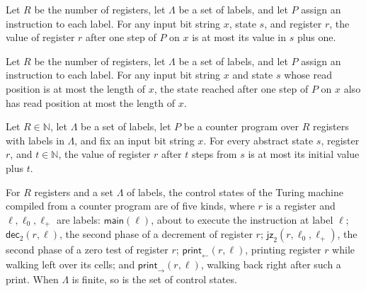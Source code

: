 \begin{theorem}
\label{Complexity.CounterProg.step_regs_le}
\leanok
{}
Let $R$ be the number of registers, let $\Lambda$ be a set of labels, and let $P$ assign
an instruction to each label. For any input bit string $x$, state $s$, and register $r$,
the value of register $r$ after one step of $P$ on $x$ is at most its value in $s$ plus
one.
\end{theorem}

\begin{theorem}
\label{Complexity.CounterProg.step_pos_le}
\leanok
{}
Let $R$ be the number of registers, let $\Lambda$ be a set of labels, and let $P$ assign
an instruction to each label. For any input bit string $x$ and state $s$ whose read
position is at most the length of $x$, the state reached after one step of $P$ on $x$
also has read position at most the length of $x$.
\end{theorem}

\begin{theorem}
\label{Complexity.CounterProg.run_regs_le}
\leanok
{}
Let $R\in\mathbb{N}$, let $\Lambda$ be a set of labels, let $P$ be a counter program
over $R$ registers with labels in $\Lambda$, and fix an input bit string $x$. For every
abstract state $s$, register $r$, and $t\in\mathbb{N}$, the value of register $r$ after
$t$ steps from $s$ is at most its initial value plus $t$.
\end{theorem}

\begin{definition}
\label{Complexity.CounterProg.TSt}
\leanok
For $R$ registers and a set $\Lambda$ of labels, the control states of the Turing machine
compiled from a counter program are of five kinds, where $r$ is a register and
$\ell, \ell_0, \ell_+$ are labels: $\mathsf{main}(\ell)$, about to execute the instruction at
label $\ell$; $\mathsf{dec}_2(r, \ell)$, the second phase of a decrement of register $r$;
$\mathsf{jz}_2(r, \ell_0, \ell_+)$, the second phase of a zero test of register $r$;
$\mathsf{print}_{\leftarrow}(r, \ell)$, printing register $r$ while walking left over its cells;
and $\mathsf{print}_{\rightarrow}(r, \ell)$, walking back right after such a print. When
$\Lambda$ is finite, so is the set of control states.
\end{definition}

